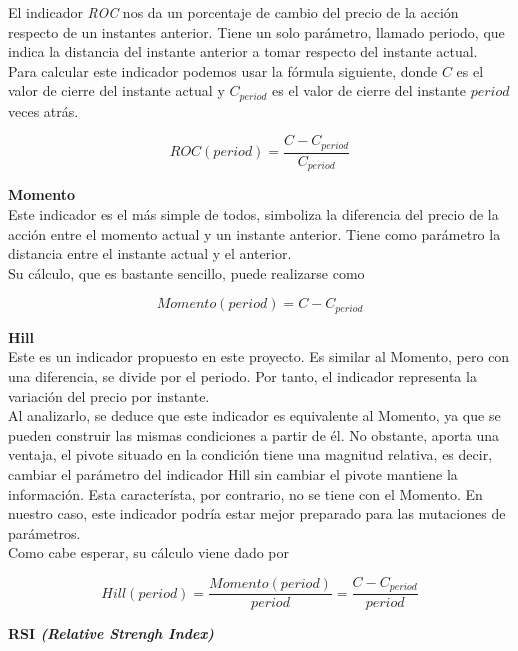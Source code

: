 \begin{appendices}
El indicador \textit{ROC} nos da un porcentaje de cambio del precio de la acci\'on respecto de un instantes anterior. Tiene un solo par\'ametro, llamado periodo, que indica la distancia del instante anterior a tomar respecto del instante actual.\\

Para calcular este indicador podemos usar la f\'ormula siguiente, donde $C$ es el valor de cierre del instante actual y $C_{period}$ es el valor de cierre del instante $period$ veces atr\'as.

\[ROC(period) = \frac{C - C_{period}}{C_{period}}\]

\vspace{0.5cm}
\noindent\textbf{Momento}\\

Este indicador es el m\'as simple de todos, simboliza la diferencia del precio de la acci\'on entre el momento actual y un instante anterior. Tiene como par\'ametro la distancia entre el instante actual y el anterior.\\

Su c\'alculo, que es bastante sencillo, puede realizarse como

\[Momento(period) = C - C_{period}\] 


\vspace{0.5cm}
\noindent\textbf{Hill}\\

Este es un indicador propuesto en este proyecto. Es similar al Momento, pero con una diferencia, se divide por el periodo. Por tanto, el indicador representa la variaci\'on del precio por instante.\\

Al analizarlo, se deduce que este indicador es equivalente al Momento, ya que se pueden construir las mismas condiciones a partir de \'el. No obstante, aporta una ventaja, el pivote situado en la condici\'on tiene una magnitud relativa, es decir, cambiar el par\'ametro del indicador Hill sin cambiar el pivote mantiene la informaci\'on. Esta caracter\'ista, por contrario, no se tiene con el Momento. En nuestro caso, este indicador podr\'ia estar mejor preparado para las mutaciones de par\'ametros.\\ 

Como cabe esperar, su c\'alculo viene dado por

\[Hill(period) = \frac{Momento(period)}{period} = \frac{C - C_{period}}{period}\] 


\noindent\textbf{RSI \textit{(Relative Strengh Index)}}\\


\end{appendices}
